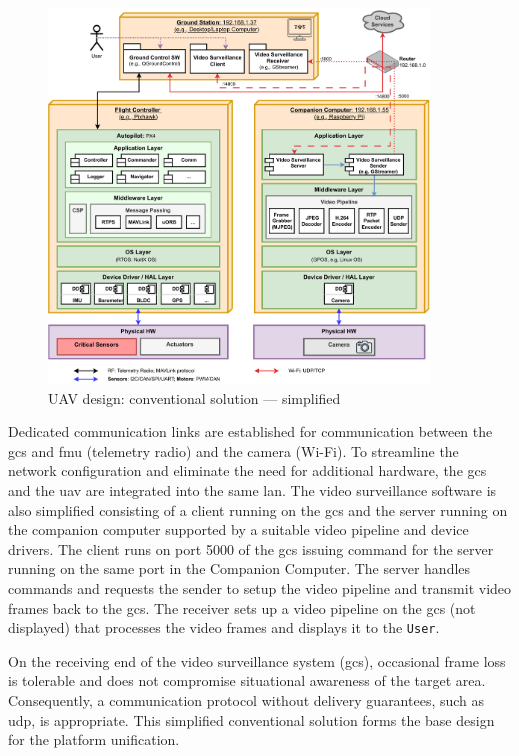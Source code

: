 \begin{figure}[!hbt]
  \centering
  \includegraphics[width=0.9\textwidth]{./img/pdf/uav-main-design-conv-sol-2.pdf} 
  \caption{UAV design: conventional solution --- simplified}%
  \label{fig:uav-design-conv-sol-2}
\end{figure}

Dedicated
communication links are established for communication between the \gls{gcs} and \gls{fmu} (telemetry radio) and the
camera (Wi-Fi). To streamline the network configuration and eliminate the need
for additional hardware, the \gls{gcs} and the \gls{uav} are integrated into the
same \gls{lan}. The video surveillance software is also simplified consisting of
a client running on the \gls{gcs} and the server running on the companion
computer supported by a suitable video pipeline and device drivers. The
client runs on port 5000 of the \gls{gcs} issuing command for the server running
on the same port in the Companion Computer. The server handles commands and
requests the sender to setup the video pipeline and transmit video frames back
to the \gls{gcs}. The receiver sets up a video pipeline on the \gls{gcs} (not
displayed) that processes the video frames and displays it to the \lstinline{User}.

On the receiving end of the video surveillance system (\gls{gcs}), occasional
frame loss is tolerable and does not compromise situational awareness of the
target area. Consequently, a communication protocol without delivery guarantees,
such as \gls{udp}, is appropriate.
%
This simplified conventional solution forms the base design for the platform
unification.


